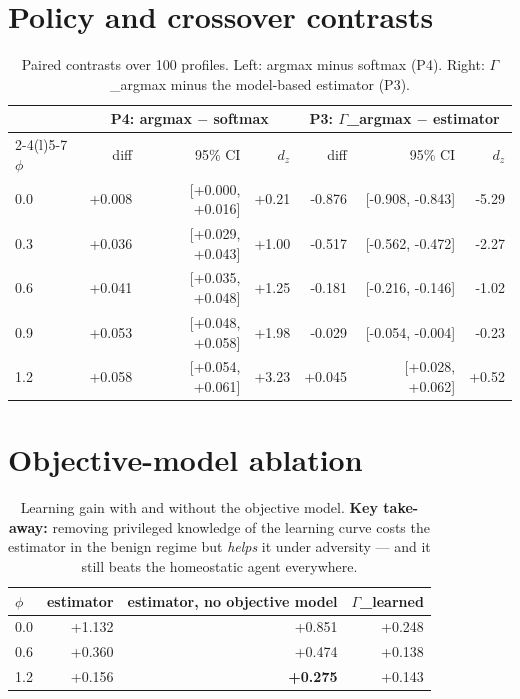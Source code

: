 \documentclass{article}
\begin{document}
\section{Policy and crossover contrasts}
\label{app:polcontrast}
\begin{table}[H]
  \caption{Paired contrasts over 100 profiles. Left: argmax minus softmax (P4). Right: $\Gamma$\_argmax minus the model-based estimator (P3).}
  \centering\small
  \begin{tabular}{lrrrrrr}
    \toprule
    & \multicolumn{3}{c}{P4: argmax $-$ softmax} & \multicolumn{3}{c}{P3: $\Gamma$\_argmax $-$ estimator} \\
    \cmidrule(r){2-4}\cmidrule(l){5-7}
    $\phi$ & diff & 95\% CI & $d_z$ & diff & 95\% CI & $d_z$ \\
    \midrule
    0.0 & +0.008 & [+0.000, +0.016] & +0.21 & -0.876 & [-0.908, -0.843] & -5.29 \\
    0.3 & +0.036 & [+0.029, +0.043] & +1.00 & -0.517 & [-0.562, -0.472] & -2.27 \\
    0.6 & +0.041 & [+0.035, +0.048] & +1.25 & -0.181 & [-0.216, -0.146] & -1.02 \\
    0.9 & +0.053 & [+0.048, +0.058] & +1.98 & -0.029 & [-0.054, -0.004] & -0.23 \\
    1.2 & +0.058 & [+0.054, +0.061] & +3.23 & +0.045 & [+0.028, +0.062] & +0.52 \\
    \bottomrule
  \end{tabular}
\end{table}

\section{Objective-model ablation}
\label{app:objmodel}
\begin{table}[H]
  \caption{Learning gain with and without the objective model. \textbf{Key take-away:} removing privileged knowledge of the learning curve costs the estimator in the benign regime but \emph{helps} it under adversity --- and it still beats the homeostatic agent everywhere.}
  \centering\small
  \begin{tabular}{lrrr}
    \toprule
    $\phi$ & estimator & estimator, no objective model & $\Gamma$\_learned \\
    \midrule
    0.0 & +1.132 & +0.851 & +0.248 \\
    0.6 & +0.360 & +0.474 & +0.138 \\
    1.2 & +0.156 & \textbf{+0.275} & +0.143 \\
    \bottomrule
  \end{tabular}
\end{table}
\end{document}
